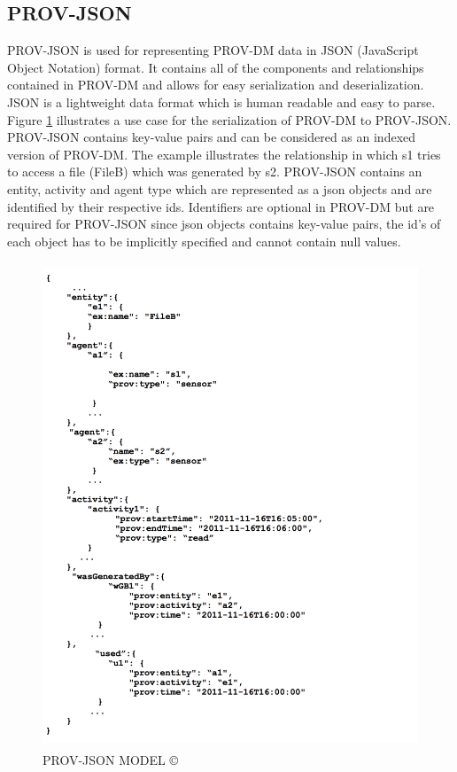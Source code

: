 \subsection{PROV-JSON}

PROV-JSON is used for representing PROV-DM data in JSON (JavaScript Object Notation) format. It contains all of the components and relationships contained in PROV-DM and allows for easy serialization and deserialization. JSON is a lightweight data format which is human readable and easy to parse. Figure \ref{provjson} illustrates a use case for the serialization of PROV-DM to PROV-JSON. PROV-JSON contains key-value pairs and can be considered as an indexed version of PROV-DM. The example illustrates the relationship in which s1 tries to access a file (FileB) which was generated by s2. PROV-JSON  contains an entity, activity and agent type which are represented as a json objects and are identified by their respective ids.  Identifiers are optional in PROV-DM but are required for PROV-JSON since json objects contains key-value pairs, the id's of each object has to be implicitly specified and cannot contain null values. 

\begin{figure}[h!]
\begin{center}

\includegraphics[height=5.7in]{prov_json_edit.png}
\end{center}
\caption{PROV-JSON MODEL \copyright \cite{prov_json}}

\label{provjson}

\end{figure}


